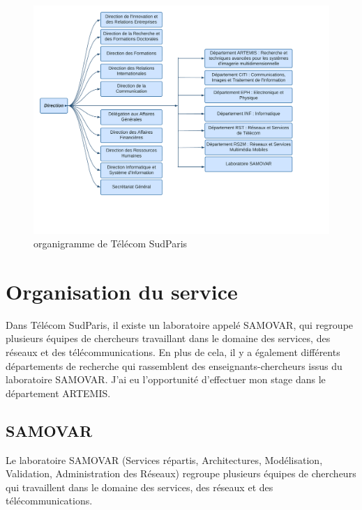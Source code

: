 \documentclass{report}
\begin{document}
{%
\begin{figure}[htbp] %
	\centering
        \includegraphics[width=16.5cm]{logo/orga.png} %
	\caption{organigramme de Télécom SudParis}
	\label{fig:organigramme de Télécom SudParis}
\end{figure}

\section{Organisation du service}
\hspace{1.6cm} Dans Télécom SudParis, il existe un laboratoire appelé SAMOVAR, qui regroupe plusieurs équipes de chercheurs travaillant dans le domaine des services, des réseaux et des télécommunications. En plus de cela, il y a également différents départements de recherche qui rassemblent des enseignants-chercheurs issus du laboratoire SAMOVAR. J'ai eu l'opportunité d'effectuer mon stage dans le département ARTEMIS.
\subsection{SAMOVAR }
\hspace{1.6cm} Le laboratoire SAMOVAR (Services répartis, Architectures, Modélisation, Validation, Administration des Réseaux) regroupe plusieurs équipes de chercheurs qui travaillent dans le domaine des services, des réseaux et des télécommunications.

}
\end{document}
